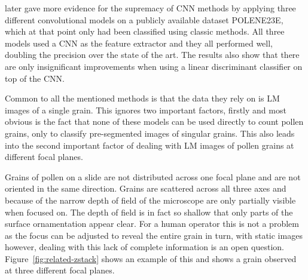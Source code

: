 {\cite{sevillano_improving_2018}} later gave more evidence for the supremacy of CNN methods by applying three different convolutional models on a publicly available dataset {POLENE23E}, which at that point only had been classified using classic methods.
All three models used a CNN as the feature extractor and they all performed well, doubling the precision over the state of the art.
The results also show that there are only insignificant improvements when using a linear discriminant classifier on top of the CNN\@.

Common to all the mentioned methods is that the data they rely on is LM images of a single grain.
This ignores two important factors, firstly and most obvious is the fact that none of these models can be used directly to count pollen grains, only to classify pre-segmented images of singular grains.
This also leads into the second important factor of dealing with LM images of pollen grains at different focal planes.

Grains of pollen on a slide are not distributed across one focal plane and are not oriented in the same direction.
Grains are scattered across all three axes and because of the narrow depth of field of the microscope are only partially visible when focused on.
The depth of field is in fact so shallow that only parts of the surface ornamentation appear clear.
For a human operator this is not a problem as the focus can be adjusted to reveal the entire grain in turn, with static images however, dealing with this lack of complete information is an open question. Figure~\ref{fig:related-zstack} shows an example of this and shows a grain observed at three different focal planes.

